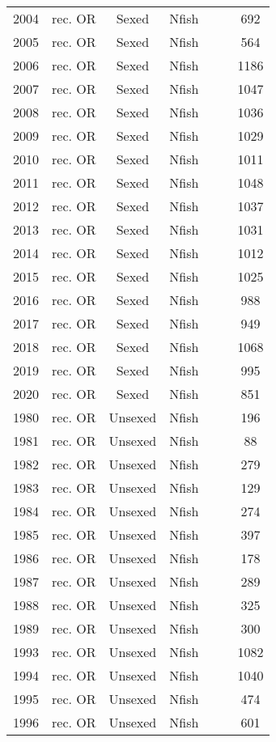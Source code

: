 \begin{longtable}[t]{c>{\centering\arraybackslash}p{3cm}ccccc}
2004 & rec. OR & Sexed & Nfish &  &  & 692\\
2005 & rec. OR & Sexed & Nfish &  &  & 564\\
2006 & rec. OR & Sexed & Nfish &  &  & 1186\\
2007 & rec. OR & Sexed & Nfish &  &  & 1047\\
2008 & rec. OR & Sexed & Nfish &  &  & 1036\\
2009 & rec. OR & Sexed & Nfish &  &  & 1029\\
2010 & rec. OR & Sexed & Nfish &  &  & 1011\\
2011 & rec. OR & Sexed & Nfish &  &  & 1048\\
2012 & rec. OR & Sexed & Nfish &  &  & 1037\\
2013 & rec. OR & Sexed & Nfish &  &  & 1031\\
2014 & rec. OR & Sexed & Nfish &  &  & 1012\\
2015 & rec. OR & Sexed & Nfish &  &  & 1025\\
2016 & rec. OR & Sexed & Nfish &  &  & 988\\
2017 & rec. OR & Sexed & Nfish &  &  & 949\\
2018 & rec. OR & Sexed & Nfish &  &  & 1068\\
2019 & rec. OR & Sexed & Nfish &  &  & 995\\
2020 & rec. OR & Sexed & Nfish &  &  & 851\\
1980 & rec. OR & Unsexed & Nfish &  &  & 196\\
1981 & rec. OR & Unsexed & Nfish &  &  & 88\\
1982 & rec. OR & Unsexed & Nfish &  &  & 279\\
1983 & rec. OR & Unsexed & Nfish &  &  & 129\\
1984 & rec. OR & Unsexed & Nfish &  &  & 274\\
1985 & rec. OR & Unsexed & Nfish &  &  & 397\\
1986 & rec. OR & Unsexed & Nfish &  &  & 178\\
1987 & rec. OR & Unsexed & Nfish &  &  & 289\\
1988 & rec. OR & Unsexed & Nfish &  &  & 325\\
1989 & rec. OR & Unsexed & Nfish &  &  & 300\\
1993 & rec. OR & Unsexed & Nfish &  &  & 1082\\
1994 & rec. OR & Unsexed & Nfish &  &  & 1040\\
1995 & rec. OR & Unsexed & Nfish &  &  & 474\\
1996 & rec. OR & Unsexed & Nfish &  &  & 601\\

\end{longtable}
